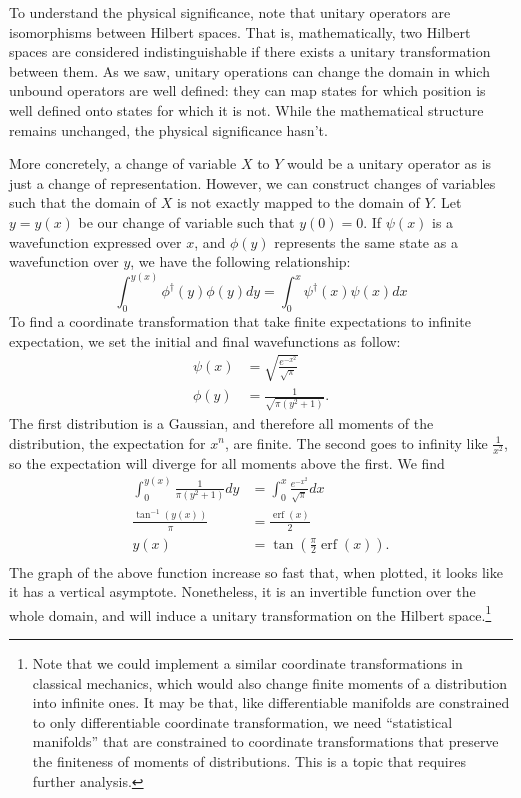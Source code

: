 \documentclass[10pt,twocolumn, nofootinbib]{revtex4-2}
\DeclareMathOperator{\erf}{erf}
\begin{document}
To understand the physical significance, note that unitary operators are isomorphisms between Hilbert spaces. That is, mathematically, two Hilbert spaces are considered indistinguishable if there exists a unitary transformation between them. As we saw, unitary operations can change the domain in which unbound operators are well defined: they can map states for which position is well defined onto states for which it is not. While the mathematical structure remains unchanged, the physical significance hasn't.

More concretely, a change of variable $X$ to $Y$ would be a unitary operator as is just a change of representation. However, we can construct changes of variables such that the domain of $X$ is not exactly mapped to the domain of $Y$. Let $y=y(x)$ be our change of variable such that $y(0) = 0$. If $\psi(x)$ is a wavefunction expressed over $x$, and $\phi(y)$ represents the same state as a wavefunction over $y$, we have the following relationship:
\begin{equation}
		\int_{0}^{y(x)} \phi^\dagger(y) \phi(y) dy = \int_{0}^{x} \psi^\dagger(x) \psi(x) dx
\end{equation}
To find a coordinate transformation that take finite expectations to infinite expectation, we set the initial and final wavefunctions as follow:
\begin{align}
	\psi(x) &= \sqrt{\frac{e^{-x^2}}{\sqrt{\pi}}} \\
	\phi(y) &= \frac{1}{\sqrt{\pi(y^2 + 1)}}.
\end{align}
The first distribution is a Gaussian, and therefore all moments of the distribution, the expectation for $x^n$, are finite. The second goes to infinity like $\frac{1}{x^2}$, so the expectation will diverge for all moments above the first. We find
\begin{equation}
	\begin{aligned}
		\int_{0}^{y(x)} \frac{1}{\pi(y^2 + 1)} dy &= \int_{0}^{x} \frac{e^{-x^2}}{\sqrt{\pi}} dx \\
		\frac{\tan^{-1}(y(x))}{\pi} &= \frac{\erf(x)}{2} \\
		y(x) &= \tan \left(\frac{\pi}{2}\erf(x)\right). \\
	\end{aligned}
\end{equation}
The graph of the above function increase so fast that, when plotted, it looks like it has a vertical asymptote. Nonetheless, it is an invertible function over the whole domain, and will induce a unitary transformation on the Hilbert space.\footnote{Note that we could implement a similar coordinate transformations in classical mechanics, which would also change finite moments of a distribution into infinite ones. It may be that, like differentiable manifolds are constrained to only differentiable coordinate transformation, we need ``statistical manifolds'' that are constrained to coordinate transformations that preserve the finiteness of moments of distributions. This is a topic that requires further analysis.}
\end{document}
